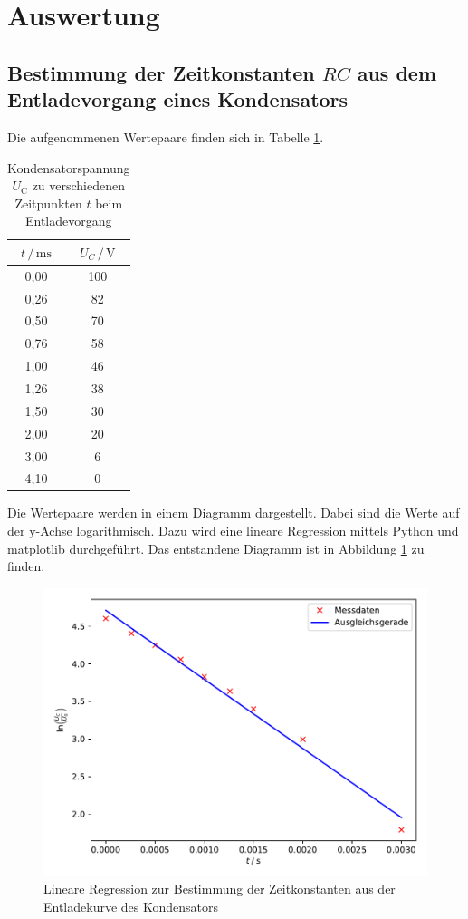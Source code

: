 \section{Auswertung}
\label{sec:Auswertung}

\subsection{Bestimmung der Zeitkonstanten $RC$ aus dem Entladevorgang eines Kondensators}

Die aufgenommenen Wertepaare finden sich in Tabelle \ref{tab:Messdaten1}.

\begin{table}
\centering
\caption{Kondensatorspannung $U_\text{C}$ zu verschiedenen Zeitpunkten $t$ beim 
Entladevorgang}
\label{tab:Messdaten1}
\begin{tabular}{c c}
\toprule
$t \,/\, \si{\milli\second}$ & $U_C \,/\, \si{\volt}$\\
\midrule
0,00 & 100\\
0,26 &  82\\
0,50 &  70\\
0,76 &  58\\
1,00 &  46\\
1,26 &  38\\
1,50 &  30\\
2,00 &  20\\
3,00 &   6\\
4,10 &   0\\
\bottomrule
\end{tabular}
\end{table} 

Die Wertepaare werden in einem Diagramm dargestellt. Dabei sind die Werte auf der
y-Achse logarithmisch. Dazu wird eine lineare Regression mittels Python und 
matplotlib durchgeführt. Das entstandene Diagramm ist in Abbildung 
\ref{fig:plot1} zu finden. 

\begin{figure}
  \centering
  \includegraphics[scale=0.8]{content/plot1.pdf}
  \caption{Lineare Regression zur Bestimmung der Zeitkonstanten aus der Entladekurve
  des Kondensators}
  \label{fig:plot1}
\end{figure}

